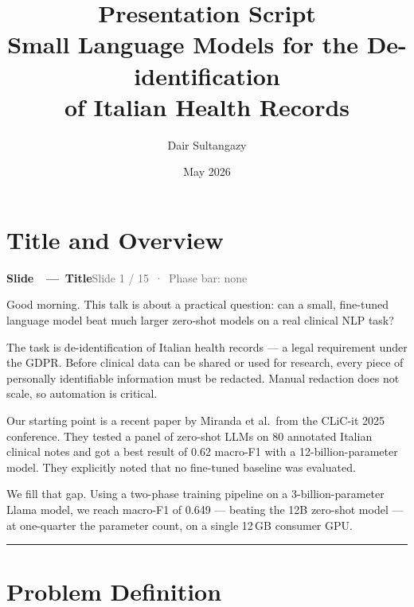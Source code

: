 \documentclass[11pt,a4paper]{article}
\title{\textbf{Presentation Script}\\[0.3em]
\large Small Language Models for the De-identification\\
of Italian Health Records}
\author{Dair Sultangazy}
\date{May 2026}
\newcounter{slidectr}
\newcommand{\slidescript}[3]{%
  \stepcounter{slidectr}
  \begin{slidebox}
    \noindent\textbf{Slide \theslidectr\ \,—\, #1}\hfill\small\textcolor{dimgray}{#2}
  \end{slidebox}
  \vspace{0.4em}
  #3
  \vspace{1.2em}
  \noindent\textcolor{dimgray!60}{\rule{\linewidth}{0.4pt}}
  \vspace{0.6em}
}
\begin{document}
\maketitle
\tableofcontents
\newpage

\section{Title and Overview}

\slidescript{Title}{Slide 1 / 15 \,·\, Phase bar: none}{

Good morning. This talk is about a practical question: can a small, fine-tuned language model beat much larger zero-shot models on a real clinical NLP task?

The task is de-identification of Italian health records — a legal requirement under the GDPR. Before clinical data can be shared or used for research, every piece of personally identifiable information must be redacted. Manual redaction does not scale, so automation is critical.

Our starting point is a recent paper by Miranda et al.\ from the CLiC-it 2025 conference. They tested a panel of zero-shot LLMs on 80 annotated Italian clinical notes and got a best result of 0.62 macro-F1 with a 12-billion-parameter model. They explicitly noted that no fine-tuned baseline was evaluated.

We fill that gap. Using a two-phase training pipeline on a 3-billion-parameter Llama model, we reach macro-F1 of 0.649 — beating the 12B zero-shot model — at one-quarter the parameter count, on a single 12\,GB consumer GPU.

}

\section{Problem Definition}
\end{document}

